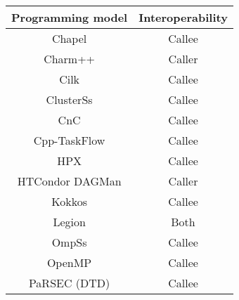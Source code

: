 \begin{tabular}{cc}
\hline
Programming model & Interoperability \\
\hline
Chapel & Callee\\
Charm++ & Caller\\
Cilk & Callee\\
ClusterSs & Callee\\
CnC & Callee\\
Cpp-TaskFlow & Callee\\
HPX & Callee\\
HTCondor DAGMan & Caller\\
Kokkos & Callee\\
Legion & Both\\
OmpSs & Callee\\
OpenMP & Callee\\
PaRSEC (DTD) & Callee\\
\hline
\end{tabular}
